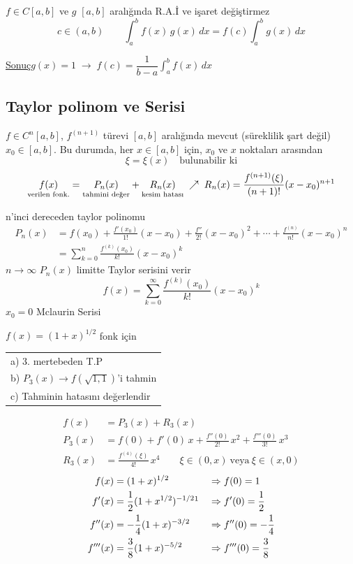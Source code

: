\documentclass[11pt,a4paper]{article}
\begin{document}
\begin{teorem}
$f \in C[a,b]$ ve $g$ $[a,b]$ aralığında R.A.İ ve işaret değiştirmez
\[
  c \in (a,b) \qquad \int_a^b f(x)\,g(x)\,dx = f(c)\int_a^b g(x)\,dx
\]
\end{teorem}
\noindent\underline{\small Sonuç}\qquad $g(x) = 1 \;\rightarrow\; f(c) = \dfrac{1}{b-a}\displaystyle\int_a^b f(x)\,dx$

\subsection{Taylor polinom ve Serisi}
\begin{teorem}[(Taylor)]
$f \in C^n[a,b]$, $f^{(n+1)}$ türevi $[a,b]$ aralığında mevcut (süreklilik şart değil) $x_0 \in [a,b]$.
Bu durumda, her $x \in [a,b]$ için, $x_0$ ve $x$ noktaları arasından
\[
  \xi = \xi(x) \quad \text{bulunabilir ki}
\]
\[
  \underset{\text{\scriptsize verilen fonk.}}{f(x)} = \underset{\text{\scriptsize tahmini değer}}{P_n(x)}
  + \underset{\text{\scriptsize kesim hatası}}{R_n(x)}
  \;\nearrow\; R_n(x) = \frac{f^{(n+1)}(\xi)}{(n+1)!}(x-x_0)^{n+1}
\]
\end{teorem}
{\small n'inci dereceden taylor polinomu}
\begin{align*}
  P_n(x) &= f(x_0) + \frac{f'(x_0)}{1!}(x-x_0) + \frac{f''}{2!}(x-x_0)^2 + \cdots + \frac{f^{(n)}}{n!}(x-x_0)^n\\
  &= \sum_{k=0}^{n} \frac{f^{(k)}(x_0)}{k!}(x-x_0)^k
\end{align*}
$n \to \infty$ \quad $P_n(x)$ limitte Taylor serisini verir
\[
  f(x) = \sum_{k=0}^{\infty} \frac{f^{(k)}(x_0)}{k!}(x-x_0)^k
\]
\hspace*{2em}$x_0 = 0$ \quad Mclaurin Serisi

\begin{ornek}[4]
$f(x) = (1+x)^{1/2}$ fonk için \hfill
\begin{tabular}[t]{l}
a) 3. mertebeden T.P\\
b) $P_3(x) \rightarrow f(\sqrt{1{,}1})$'i tahmin\\
c) Tahminin hatasını değerlendir
\end{tabular}
\end{ornek}
\begin{align*}
  f(x) &= P_3(x) + R_3(x)\\
  P_3(x) &= f(0) + f'(0)\,x + \frac{f''(0)}{2!}\,x^2 + \frac{f'''(0)}{3!}\,x^3\\
  R_3(x) &= \frac{f^{(4)}(\xi)}{4!}\,x^4 \qquad \xi \in (0,x) \ \text{veya}\ \xi \in (x,0)
\end{align*}
\begin{align*}
  f(x) &= (1+x)^{1/2} &&\Rightarrow f(0) = 1\\
  f'(x) &= \frac{1}{2}(1 + x^{1/2})^{-1/2}\footnotemark &&\Rightarrow f'(0) = \frac{1}{2}\\
  f''(x) &= -\frac{1}{4}(1+x)^{-3/2} &&\Rightarrow f''(0) = -\frac{1}{4}\\
  f'''(x) &= \frac{3}{8}(1+x)^{-5/2} &&\Rightarrow f'''(0) = \frac{3}{8}
\end{align*}
\end{document}
